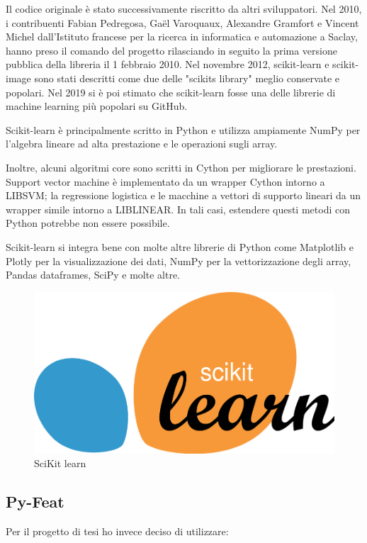 Il codice originale è stato successivamente riscritto da altri sviluppatori. Nel 2010, i contribuenti Fabian Pedregosa, Gaël Varoquaux, Alexandre Gramfort e Vincent Michel dall'Istituto francese per la ricerca in informatica e automazione a Saclay, hanno preso il comando del progetto rilasciando in  seguito la prima versione pubblica della libreria il 1 febbraio 2010. Nel novembre 2012, scikit-learn e scikit-image sono stati descritti come due delle "scikits library" meglio conservate e popolari. 
Nel 2019 si è poi stimato che scikit-learn fosse una delle librerie di machine learning più popolari su GitHub.

Scikit-learn è principalmente scritto in Python e utilizza ampiamente NumPy per l'algebra lineare ad alta prestazione e le operazioni sugli array. 

Inoltre, alcuni algoritmi core sono scritti in Cython per migliorare le prestazioni. Support vector machine è implementato da un wrapper Cython intorno a LIBSVM; la regressione logistica e le macchine a vettori di supporto lineari da un wrapper simile intorno a LIBLINEAR. In tali casi, estendere questi metodi con Python potrebbe non essere possibile.

Scikit-learn si integra bene con molte altre librerie di Python come Matplotlib e Plotly per la visualizzazione dei dati, NumPy per la vettorizzazione degli array, Pandas dataframes, SciPy e molte altre.

\begin{figure}
    \begin{center}    
        \includegraphics[width=0.7 \linewidth]{images/image9.png}
        \caption{SciKit learn}
    \end{center}
\end{figure}

\subsection{Py-Feat}
Per il progetto di tesi ho invece deciso di utilizzare:

